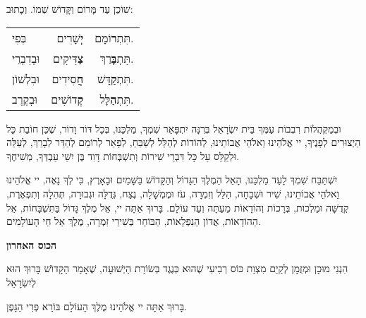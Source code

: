 \vspace{0.5em}

שׁוֹכֵן עַד מָּרוֹם וְקָּדוֹשׁ שְׁמוֹ. וְכָתוּב: 

\begin{center}
\begin{tabular}{l r r}
בְּפִי & {\large \bfseries יְ}שָׁרִים & תִּתְ{\large \bfseries ר}וֹמָם. \\
וּבְדִבְרֵי & {\large \bfseries צַ}דִּיקִים & תִּתְ{\large \bfseries בָּ}רַךְ. \\
וּבִלְשׁוֹן & {\large \bfseries חֲ}סִידִים & תִּתְ{\large \bfseries קַ}דָּשׁ. \\
וּבְקֶרֶב & {\large \bfseries קְ}דוֹשִׁים & תִּתְ{\large \bfseries הַ}לָּל. \\
\end{tabular}
\end{center}

וּבְמַקְהֲלוֹת רִבְבוֹת עַמְּךָ בֵּית יִשְׂרָאֵל בְּרִנָּה יִתְפָּאֵר שִׁמְךָ, מַלְכֵּנוּ, בְּכָל דּוֹר וָדוֹר, שֶׁכֵּן חוֹבַת כָּל הַיְצוּרִים לְפָנֶיךָ, יי אֱלֹהֵינוּ וֵאלֹהֵי אֲבוֹתֵינוּ, לְהוֹדוֹת לְהַלֵּל לְשַׁבֵּחַ, לְפָאֵר לְרוֹמֵם לְהַדֵּר לְבָרֵךְ, לְעַלֵּה וּלְקַלֵּס עַל כָּל דִּבְרֵי שִׁירוֹת וְתִשְׁבְּחוֹת דָּוִד בֶּן יִשַׁי עַבְדְּךָ, מְשִׁיחֶךָ.

\vspace{1em}

יִשְׁתַּבַּח שִׁמְךָ לָעַד מַלְכֵּנוּ, הָאֵל הַמֶלֶךְ הַגָּדוֹל וְהַקָּדוֹשׁ בַּשָּׁמַיִם וּבָאָרֶץ, כִּי לְךָ נָאֶה, יי אֱלֹהֵינוּ וֵאלֹהֵי אֲבוֹתֵינוּ, שִׁיר וּשְׁבָחָה, הַלֵּל וְזִמְרָה, עֹז וּמֶמְשָׁלָה, נֶצַח, גְּדֻלָּה וּגְבוּרָה, תְּהִלָה וְתִפְאֶרֶת, קְדֻשָּׁה וּמַלְכוּת, בְּרָכוֹת וְהוֹדָאוֹת מֵעַתָּה וְעַד עוֹלָם. בָּרוּךְ אַתָּה יי, אֵל מֶלֶךְ גָּדוֹל בַּתִּשְׁבָּחוֹת, אֵל הַהוֹדָאוֹת, אֲדוֹן הַנִפְלָאוֹת, הַבּוֹחֵר בְּשִׁירֵי זִמְרָה, מֶלֶךְ אֵל חֵי הָעוֹלָמִים.

\begin{center}
{\large \bfseries \textcolor{light-gray}{
הכוס האחרון
}}
\end{center}


הִנְנִי מוּכָן וּמְזֻמָן לְקַיֵם מִצְוַת כּוֹס רְבִיעִי שֶׁהוּא כְּנֶגֶד בְּשׂוֹרַת הַיְשׁוּעָה, שֶׁאָמַר הַקָּדוֹשׁ בָּרוּךְ הוּא לְיִשְׂרָאֵל 

בָּרוּךְ אַתָּה יי אֱלֹהֵינוּ מֶלֶךְ הָעוֹלָם בּוֹרֵא פְּרִי הַגָּפֶן.

